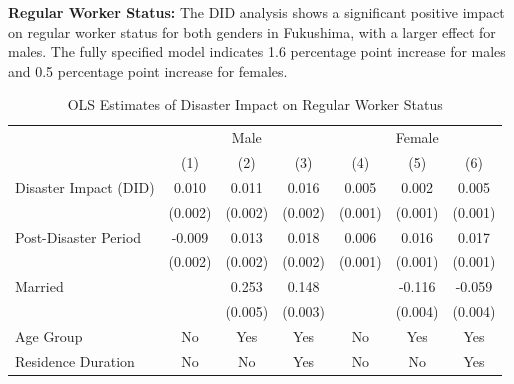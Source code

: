 \documentclass[serif, aspectratio=169]{beamer}
\begin{document}
\begin{frame}[label=regular_status]

\textbf{Regular Worker Status:} The DID analysis shows a significant positive impact on regular worker status for both genders in Fukushima, with a larger effect for males. The fully specified model indicates 1.6 percentage point increase for males and 0.5 percentage point increase for females.

\begin{table}[htbp]
\centering
\caption{OLS Estimates of Disaster Impact on Regular Worker Status}

\vspace{-0.2cm}


\begin{tabular}{@{}l*{6}{c}@{}}
          &\multicolumn{3}{c}{Male}                                &\multicolumn{3}{c}{Female}                              \\\cmidrule(lr){2-4}\cmidrule(lr){5-7}
          &\multicolumn{1}{c}{(1)}         &\multicolumn{1}{c}{(2)}         &\multicolumn{1}{c}{(3)}         &\multicolumn{1}{c}{(4)}         &\multicolumn{1}{c}{(5)}         &\multicolumn{1}{c}{(6)}         \\
\toprule
Disaster Impact (DID)&    0.010\sym{***}&    0.011\sym{***}&    0.016\sym{***}&    0.005\sym{***}&    0.002         &    0.005\sym{***}\\
          &  (0.002)         &  (0.002)         &  (0.002)         &  (0.001)         &  (0.001)         &  (0.001)         \\
\addlinespace
Post-Disaster Period&   -0.009\sym{***}&    0.013\sym{***}&    0.018\sym{***}&    0.006\sym{***}&    0.016\sym{***}&    0.017\sym{***}\\
          &  (0.002)         &  (0.002)         &  (0.002)         &  (0.001)         &  (0.001)         &  (0.001)         \\
\addlinespace
Married   &                  &    0.253\sym{***}&    0.148\sym{***}&                  &   -0.116\sym{***}&   -0.059\sym{***}\\
          &                  &  (0.005)         &  (0.003)         &                  &  (0.004)         &  (0.004)         \\
\midrule
Age Group &       No         &      Yes         &      Yes         &       No         &      Yes         &      Yes         \\
Residence Duration&       No         &       No         &      Yes         &       No         &       No         &      Yes         \\

\end{tabular}
\end{table}
\end{frame}
\end{document}

